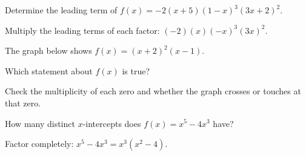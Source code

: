 \documentclass{ximera}
\begin{document}
\begin{problem}
Determine the leading term of $f(x) = -2(x+5)(1-x)^3(3x+2)^2$.
\begin{hint}
Multiply the leading terms of each factor: $(-2)(x)(-x)^3(3x)^2$.
\end{hint}
\begin{multipleChoice}
\end{multipleChoice}
\end{problem}

\begin{problem}
The graph below shows $f(x) = (x+2)^2(x-1)$.

\begin{center}
\end{center}

Which statement about $f(x)$ is true?
\begin{hint}
Check the multiplicity of each zero and whether the graph crosses or touches at that zero.
\end{hint}
\begin{multipleChoice}
\end{multipleChoice}
\end{problem}

\begin{problem}
How many distinct $x$-intercepts does $f(x) = x^5 - 4x^3$ have?
\begin{hint}
Factor completely: $x^5-4x^3 = x^3(x^2-4)$.
\end{hint}
\begin{multipleChoice}
\end{multipleChoice}
\end{problem}
\end{document}
